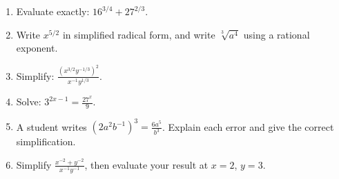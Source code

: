 \documentclass[12pt]{article}
\begin{document}
\begin{enumerate}[leftmargin=*,itemsep=0pt,resume]
  \item Evaluate exactly: $\displaystyle16^{3/4}+27^{2/3}$.

  \item Write $x^{5/2}$ in simplified radical form, and write
  $\sqrt[3]{a^4}$ using a rational exponent.

  \item Simplify:
  $\displaystyle\frac{(x^{3/2}y^{-1/3})^2}{x^{-1}y^{1/3}}$.

  \item Solve: $\displaystyle3^{2x-1}=\frac{27^x}{9}$.

  \item A student writes
  $\displaystyle(2a^2b^{-1})^3=\frac{6a^5}{b^3}$.
  Explain each error and give the correct simplification.

  \item Simplify $\displaystyle\frac{x^{-2}+y^{-2}}{x^{-1}y^{-1}}$,
  then evaluate your result at $x=2$, $y=3$.
\end{enumerate}
\end{document}
